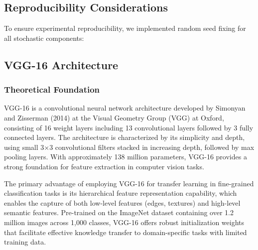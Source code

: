 \documentclass[a4paper,12pt]{article}
\begin{document}


\subsection{Reproducibility Considerations}
To ensure experimental reproducibility, we implemented random seed fixing for all stochastic components:



\subsection{VGG-16 Architecture}

\subsubsection{Theoretical Foundation}


VGG-16 is a convolutional neural network architecture developed by Simonyan and Zisserman (2014) at the Visual Geometry Group (VGG) at Oxford, consisting of 16 weight layers including 13 convolutional layers followed by 3 fully connected layers. The architecture is characterized by its simplicity and depth, using small 3×3 convolutional filters stacked in increasing depth, followed by max pooling layers. With approximately 138 million parameters, VGG-16 provides a strong foundation for feature extraction in computer vision tasks.

The primary advantage of employing VGG-16 for transfer learning in fine-grained classification tasks is its hierarchical feature representation capability, which enables the capture of both low-level features (edges, textures) and high-level semantic features. Pre-trained on the ImageNet dataset containing over 1.2 million images across 1,000 classes, VGG-16 offers robust initialization weights that facilitate effective knowledge transfer to domain-specific tasks with limited training data.
\end{document}
